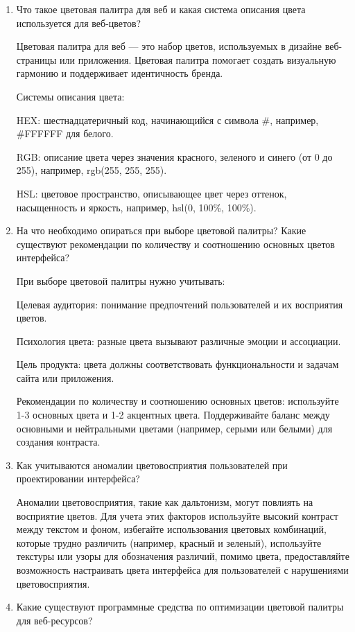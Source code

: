 \begin{enumerate}
    \item Что такое цветовая палитра для веб и какая система описания цвета используется для веб-цветов?

Цветовая палитра для веб — это набор цветов, используемых в дизайне веб-страницы или приложения. Цветовая палитра помогает создать визуальную гармонию и поддерживает идентичность бренда.

Системы описания цвета:

HEX: шестнадцатеричный код, начинающийся с символа #, например, #FFFFFF для белого.

RGB: описание цвета через значения красного, зеленого и синего (от 0 до 255), например, rgb(255, 255, 255).

HSL: цветовое пространство, описывающее цвет через оттенок, насыщенность и яркость, например, hsl(0, 100\%, 100\%).
    \item На что необходимо опираться при выборе цветовой палитры? Какие существуют рекомендации по количеству и соотношению основных цветов интерфейса?

При выборе цветовой палитры нужно учитывать:

Целевая аудитория: понимание предпочтений пользователей и их восприятия цветов.

Психология цвета: разные цвета вызывают различные эмоции и ассоциации.

Цель продукта: цвета должны соответствовать функциональности и задачам сайта или приложения.

Рекомендации по количеству и соотношению основных цветов:
используйте 1-3 основных цвета и 1-2 акцентных цвета.
Поддерживайте баланс между основными и нейтральными цветами (например, серыми или белыми) для создания контраста.
    \item Как учитываются аномалии цветовосприятия пользователей при проектировании интерфейса?

Аномалии цветовосприятия, такие как дальтонизм, могут повлиять на восприятие цветов. Для учета этих факторов используйте высокий контраст между текстом и фоном, 
избегайте использования цветовых комбинаций, которые трудно различить (например, красный и зеленый), 
используйте текстуры или узоры для обозначения различий, помимо цвета, 
предоставляйте возможность настраивать цвета интерфейса для пользователей с нарушениями цветовосприятия.
    \item Какие существуют программные средства по оптимизации цветовой палитры для веб-ресурсов?


\end{enumerate}
